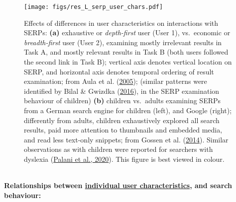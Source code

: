 \documentclass[a4paper, nobind]{templates/ociamthesis}
\begin{document}
\begin{figure}
\hypertarget{fig_res_L_serp_user_chars}{%
\centering
\texttt{[image: figs/res\_L\_serp\_user\_chars.pdf]}
\caption{Effects of differences in user characteristics on interactions with
SERPs: \textbf{(a)} exhaustive or \emph{depth-first} user (User 1), vs.~economic
or \emph{breadth-first} user (User 2), examining mostly irrelevant results in
Task A, and mostly relevant results in Task B (both users followed the
second link in Task B); vertical axis denotes vertical location on SERP,
and horizontal axis denotes temporal ordering of result examination;
from Aula et al. (\protect\hyperlink{ref-102}{2005}); (similar patterns were identified by Bilal \& Gwizdka (\protect\hyperlink{ref-139}{2016}), in the SERP
examination behaviour of children) \textbf{(b)} children vs.~adults examining
SERPs from a German search engine for children (left), and Google
(right); differently from adults, children exhaustively explored all
search results, paid more attention to thumbnails and embedded media,
and read less text-only snippets; from Gossen et al. (\protect\hyperlink{ref-124}{2014}). Similar observations as
with children were reported for searchers with dyslexia
(\protect\hyperlink{ref-palani2020eye}{Palani et al., 2020}). This figure is best viewed in colour.}\label{fig_res_L_serp_user_chars}
}
\end{figure}

~\\
\textbf{Relationships between \uline{individual user characteristics},
and search behaviour:}
\end{document}
